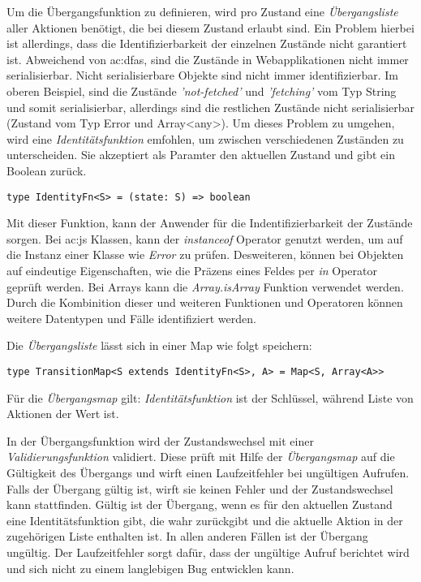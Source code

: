 Um die Übergangsfunktion zu definieren, wird pro Zustand eine \textit{Übergangsliste} aller Aktionen benötigt, die bei diesem Zustand erlaubt sind. Ein Problem hierbei ist allerdings, dass die Identifizierbarkeit der einzelnen Zustände nicht garantiert ist.
Abweichend von \acrlong{ac:dfa}s, sind die Zustände in Webapplikationen nicht immer serialisierbar. Nicht serialisierbare Objekte sind nicht immer identifizierbar. Im oberen Beispiel, sind die Zustände \textit{'not-fetched'} und \textit{'fetching'} vom Typ String und somit serialisierbar, allerdings sind die restlichen Zustände nicht serialisierbar (Zustand vom Typ Error und Array<any>). Um dieses Problem zu umgehen, wird eine \textit{Identitätsfunktion} emfohlen, um zwischen verschiedenen Zuständen zu unterscheiden. Sie akzeptiert als Paramter den aktuellen Zustand und gibt ein Boolean zurück.

\begin{lstlisting}
type IdentityFn<S> = (state: S) => boolean
\end{lstlisting}


Mit dieser Funktion, kann der Anwender für die Indentifizierbarkeit der Zustände sorgen. Bei \acrlong{ac:js} Klassen, kann der \textit{instanceof} Operator genutzt werden, um auf die Instanz einer Klasse wie \textit{Error} zu prüfen.\cite{jsInstanceofOperator} Desweiteren, können bei Objekten auf eindeutige Eigenschaften, wie die Präzens eines Feldes per \textit{in} Operator geprüft werden.\cite{jsInOperator} Bei Arrays kann die \textit{Array.isArray} Funktion verwendet werden.\cite{jsIsArray} Durch die Kombinition dieser und weiteren Funktionen und Operatoren können weitere Datentypen und Fälle identifiziert werden.

Die \textit{Übergangsliste} lässt sich in einer Map wie folgt speichern:

\begin{lstlisting}
type TransitionMap<S extends IdentityFn<S>, A> = Map<S, Array<A>>
\end{lstlisting}

Für die \textit{Übergangsmap} gilt: \textit{Identitätsfunktion} ist der Schlüssel, während Liste von Aktionen der Wert ist.

In der Übergangsfunktion wird der Zustandswechsel mit einer \textit{Validierungsfunktion} validiert. Diese prüft mit Hilfe der \textit{Übergangsmap} auf die Gültigkeit des Übergangs und wirft einen Laufzeitfehler bei ungültigen Aufrufen. Falls der Übergang gültig ist, wirft sie keinen Fehler und der Zustandswechsel kann stattfinden. Gültig ist der Übergang, wenn es für den aktuellen Zustand eine Identitätsfunktion gibt, die wahr zurückgibt und die aktuelle Aktion in der zugehörigen Liste enthalten ist. In allen anderen Fällen ist der Übergang ungültig.
Der Laufzeitfehler sorgt dafür, dass der ungültige Aufruf berichtet wird und sich nicht zu einem langlebigen Bug entwicklen kann.

